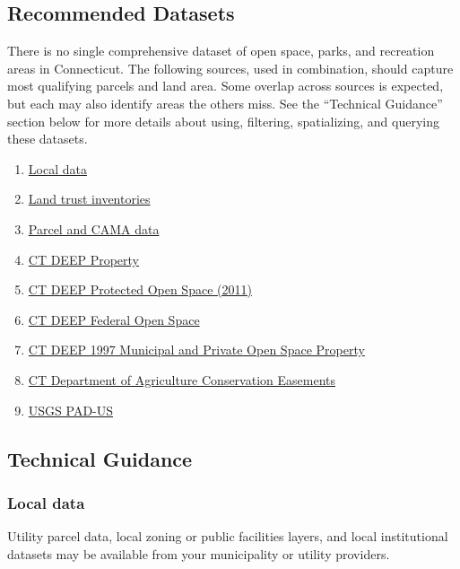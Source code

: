 \documentclass[
  letterpaper,
  DIV=11,
  numbers=noendperiod]{scrreprt}
\providecommand{\tightlist}{%
  \setlength{\itemsep}{0pt}\setlength{\parskip}{0pt}}
\begin{document}
\subsection{Recommended Datasets}\label{recommended-datasets-1}

There is no single comprehensive dataset of open space, parks, and
recreation areas in Connecticut. The following sources, used in
combination, should capture most qualifying parcels and land area. Some
overlap across sources is expected, but each may also identify areas the
others miss. See the ``Technical Guidance'' section below for more
details about using, filtering, spatializing, and querying these
datasets.

\begin{enumerate}
\def\labelenumi{\arabic{enumi}.}
\tightlist
\item
  \hyperref[sec-local-data2]{Local data}
\item
  \hyperref[sec-land-trust-inventories]{Land trust inventories}
\item
  \hyperref[sec-parcel-and-cama-data2]{Parcel and CAMA data}
\item
  \hyperref[sec-ct-deep-property]{CT DEEP Property}
\item
  \hyperref[sec-ct-deep-protected-open-space-2011]{CT DEEP Protected
  Open Space (2011)}
\item
  \hyperref[sec-ct-deep-federal-open-space]{CT DEEP Federal Open Space}
\item
  \hyperref[sec-ct-deep-1997-municipal-and-private-open-space-property]{CT
  DEEP 1997 Municipal and Private Open Space Property}
\item
  \hyperref[sec-ct-department-of-agriculture-conservation-easements]{CT
  Department of Agriculture Conservation Easements}
\item
  \hyperref[sec-usgs-protected-areas-database-of-the-united-states]{USGS
  PAD-US}
\end{enumerate}

\subsection{Technical Guidance}\label{technical-guidance-1}

\subsubsection{Local data}\label{sec-local-data2}

Utility parcel data, local zoning or public facilities layers, and local
institutional datasets may be available from your municipality or
utility providers.
\end{document}
